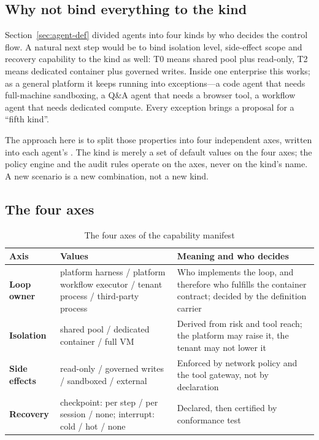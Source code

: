 \subsection{Why not bind everything to the kind}

Section~\ref{sec:agent-def} divided agents into four kinds by who decides the control flow. A natural next step would be to bind isolation level, side-effect scope and recovery capability to the kind as well: T0 means shared pool plus read-only, T2 means dedicated container plus governed writes. Inside one enterprise this works; as a general platform it keeps running into exceptions---a code agent that needs full-machine sandboxing, a Q\&A agent that needs a browser tool, a workflow agent that needs dedicated compute. Every exception brings a proposal for a ``fifth kind''.

The approach here is to split those properties into four independent axes, written into each agent's . The kind is merely a set of default values on the four axes; the policy engine and the audit rules operate on the axes, never on the kind's name. A new scenario is a new combination, not a new kind.

\subsection{The four axes}

\begin{table}[htbp]
\centering
\caption{The four axes of the capability manifest}
\label{tab:axes}
\begin{tabularx}{\textwidth}{@{}>{\bfseries}L{2.9cm}L{6.0cm}Y@{}}
  \toprule
  \textbf{Axis} & \textbf{Values} & \textbf{Meaning and who decides}\\
  \midrule
  Loop owner  & platform harness / platform workflow executor / tenant process / third-party process & Who implements the loop, and therefore who fulfills the container contract; decided by the definition carrier\\
  Isolation  & shared pool / dedicated container / full VM & Derived from risk and tool reach; the platform may raise it, the tenant may not lower it\\
  Side effects  & read-only / governed writes / sandboxed / external & Enforced by network policy and the tool gateway, not by declaration\\
  Recovery  & checkpoint: per step / per session / none; interrupt: cold / hot / none & Declared, then certified by conformance test\\
  \bottomrule
\end{tabularx}
\end{table}

